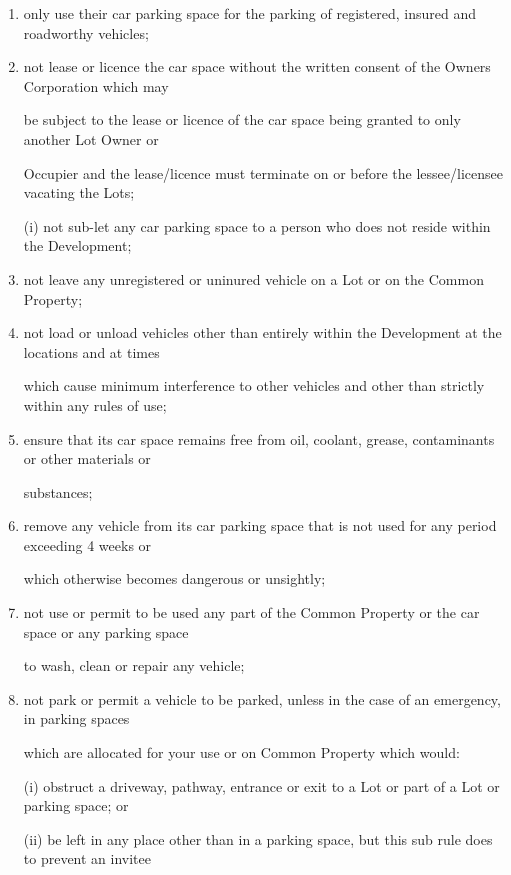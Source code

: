 \documentclass{article}
\begin{document}
\begin{enumerate}[label=\arabic*.]
\begin{enumerate}[label=\arabic{enumi}.\arabic*.]
\begin{enumerate}[label=(\arabic*)]
\begin{enumerate}[label=(\alph*)]
\item  only use their car parking space for the parking of registered, insured and roadworthy vehicles; 

\item  not lease or licence the car space without the written consent of the Owners Corporation which may 

be subject to the lease or licence of the car space being granted to only another Lot Owner or 

Occupier and the lease/licence must terminate on or before the lessee/licensee vacating the Lots; 

(i) not sub-let any car parking space to a person who does not reside within the Development; 

\item  not leave any unregistered or uninured vehicle on a Lot or on the Common Property; 

\item  not load or unload vehicles other than entirely within the Development at the locations and at times 

which cause minimum interference to other vehicles and other than strictly within any rules of use; 

\newpage

\item  ensure that its car space remains free from oil, coolant, grease, contaminants or other materials or 

substances; 

\item  remove any vehicle from its car parking space that is not used for any period exceeding 4 weeks or 

which otherwise becomes dangerous or unsightly; 

\item  not use or permit to be used any part of the Common Property or the car space or any parking space 

to wash, clean or repair any vehicle; 

\item  not park or permit a vehicle to be parked, unless in the case of an emergency, in parking spaces 

which are allocated for your use or on Common Property which would: 

(i) obstruct a driveway, pathway, entrance or exit to a Lot or part of a Lot or parking space; or 

(ii) be left in any place other than in a parking space, but this sub rule does to prevent an invitee 


\end{enumerate}
\end{enumerate}
\end{enumerate}
\end{enumerate}
\end{document}
